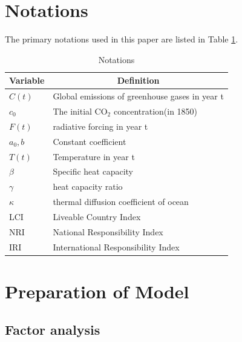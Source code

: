 \documentclass[12pt]{article}  %
\begin{document}
\section{Notations}
The primary notations used in this paper are listed in Table \ref{Notations}.
\begin{table}[htbp]
  \centering
  \caption{Notations}
    \begin{tabular}{ll}
    \toprule
    \multicolumn{1}{c}{Variable} & \multicolumn{1}{c}{Definition} \\
    \midrule
    $C(t)$  & Global emissions of greenhouse gases in year t \\
    
    $c_0$    & The initial CO$_2$ concentration(in 1850) \\
    $F(t)$  & radiative forcing in year t \\
    $a_0,b$  & \textcolor[rgb]{ .133,  .133,  .133}{Constant coefficient} \\
    $T(t)$  & \textcolor[rgb]{ .2,  .2,  .2}{Temperature in year t} \\
    $\beta$  & Specific heat capacity \\
    $\gamma$ & heat capacity ratio  \\
    $\kappa$ & \multicolumn{1}{p{25.555em}}{thermal diffusion coefficient of ocean} \\
    LCI   & Liveable Country Index \\
    NRI   & \textcolor[rgb]{ .133,  .133,  .133}{National Responsibility Index} \\
    IRI   & International Responsibility Index \\
    \toprule
    \end{tabular}%
  \label{Notations}%
\end{table}%



\section{Preparation of Model}




\subsection{Factor analysis}
\end{document}
